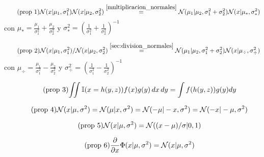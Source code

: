 \documentclass[article]{jss}
\newif\ifen
\newif\ifes
\newcommand{\en}[1]{\ifen#1\fi}
\newcommand{\es}[1]{\ifes#1\fi}
\newcommand{\N}{\mathcal{N}}
\begin{document}

\en{Let $\N$ be the Gaussian probability distribution, $\Phi$ the cumulative Gaussian distribution, $\mathbb{I}$ the indicator function.}
\es{Sea $\N$ la ditribuci\'on de probabilidad gaussiana, $\Phi$ la acumulada de una distribuc\'on gaussiana, $\mathbb{I}$ la funci\'on indicadora.}
%
\begin{equation}\label{eq:propiedad_1} \tag{\text{prop 1}}
\N(x|\mu_1,\sigma_1^2)\N(x|\mu_2,\sigma_2^2) \overset{\ref{multiplicacion_normales}}{=} \N(\mu_1|\mu_2,\sigma_1^2+\sigma_2^2) \N(x|\mu_{*},\sigma_{*}^2)
\end{equation}
%
con $\mu_{*} = \frac{\mu_1}{\sigma_1^2} + \frac{\mu_2}{\sigma_2^2}$ y $\sigma_{*}^2 = \left(\frac{1}{\sigma_1^2} + \frac{1}{\sigma_2^2} \right)^{-1}$ 

\begin{equation}\label{eq:propiedad_2} \tag{\text{prop 2}}
\N(x|\mu_1,\sigma_1^2)/\N(x|\mu_2,\sigma_2^2) \overset{\ref{sec:division_normales}}{=} \N(\mu_1|\mu_2,\sigma_1^2+\sigma_2^2) \N(x|\mu_{\div},\sigma_{\div}^2)
\end{equation}
%
con $\mu_{\div} = \frac{\mu_1}{\sigma_1^2} - \frac{\mu_2}{\sigma_2^2}$ y $\sigma_{\div}^2 = \left(\frac{1}{\sigma_1^2} - \frac{1}{\sigma_2^2} \right)^{-1}$ 

\begin{equation}\label{eq:integral_con_indicadora} \tag{\text{prop 3}}
\begin{split}
 \iint  \mathbb{I}(x=h(y,z)) f(x) g(y)\, dx\, dy = \int f(h(y,z)) g(y) dy
 \end{split}
\end{equation}

\begin{equation}\label{eq:simetria} \tag{\text{prop 4}}
 \N(x|\mu,\sigma^2) = \N(\mu|x,\sigma^2) = \N(-\mu|-x,\sigma^2) = \N(-x|-\mu,\sigma^2) 
\end{equation}

\begin{equation}\label{eq:estandarizar} \tag{\text{prop 5}}
  \N(x|\mu,\sigma^2) = \N((x-\mu)/\sigma | 0, 1)
\end{equation}

\begin{equation}\label{eq:phi_norm} \tag{\text{prop 6}}
 \frac{\partial}{\partial x} \Phi(x|\mu,\sigma^2) = \N(x|\mu,\sigma^2)
\end{equation}
\end{document}
